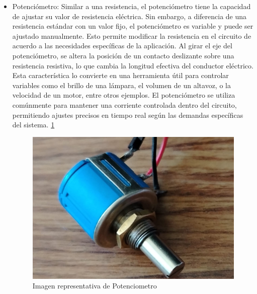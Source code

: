     \begin{itemize}
        \item Potenciómetro: Similar a una resistencia, el potenciómetro tiene la capacidad de ajustar su valor de resistencia eléctrica. Sin embargo, a diferencia de una resistencia estándar con un valor fijo, el potenciómetro es variable y puede ser ajustado manualmente. Esto permite modificar la resistencia en el circuito de acuerdo a las necesidades específicas de la aplicación. Al girar el eje del potenciómetro, se altera la posición de un contacto deslizante sobre una resistencia resistiva, lo que cambia la longitud efectiva del conductor eléctrico. Esta característica lo convierte en una herramienta útil para controlar variables como el brillo de una lámpara, el volumen de un altavoz, o la velocidad de un motor, entre otros ejemplos. El potenciómetro se utiliza comúnmente para mantener una corriente controlada dentro del circuito, permitiendo ajustes precisos en tiempo real según las demandas específicas del sistema.  \ref{fig:Potenciometro}
    
          \begin{figure}[H]
            \centering
            \includegraphics[trim = {0mm 0mm 0mm 0mm},clip,scale=0.1]{12/Img/potenciometro.jpg}
            \caption{Imagen representativa de Potenciometro}
            \label{fig:Potenciometro}
        \end{figure}
    \end{itemize}
    
